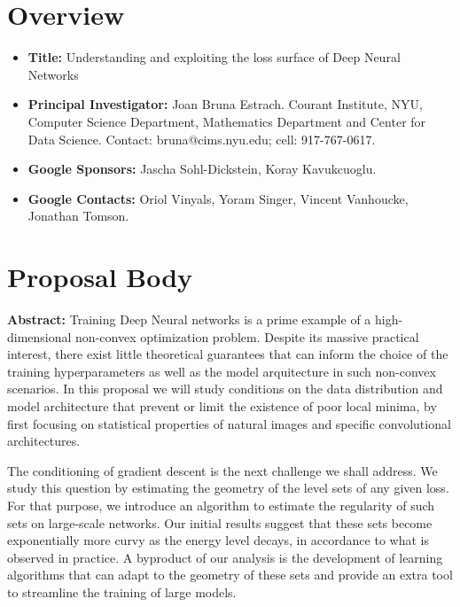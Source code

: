 \documentclass[10pt]{article}
\begin{document}


\section*{Overview}
\begin{itemize}
\item \textbf{Title:} Understanding and exploiting the loss surface of Deep Neural Networks  
\item \textbf{Principal Investigator: } Joan Bruna Estrach. Courant Institute, NYU, Computer Science Department, Mathematics Department and Center for Data Science. Contact: bruna@cims.nyu.edu; cell: 917-767-0617. 
\item \textbf{Google Sponsors:} Jascha Sohl-Dickstein, Koray Kavukcuoglu.
\item \textbf{Google Contacts:} Oriol Vinyals, Yoram Singer, Vincent Vanhoucke, Jonathan Tomson.
\end{itemize}

\section*{Proposal Body}

\textbf{Abstract:}
Training Deep Neural networks is a prime example of a high-dimensional non-convex 
optimization problem. Despite its massive practical interest, there exist little theoretical 
guarantees that can inform the choice of the training hyperparameters as well as the model 
arquitecture in such non-convex scenarios. In this proposal we will study conditions 
on the data distribution and model architecture that prevent or limit the existence 
of poor local minima, by first focusing on statistical properties of natural images
and specific convolutional architectures.
 
The conditioning of gradient descent is the next challenge we shall address. 
We study this question by estimating the geometry of the level sets of any given
loss. For that purpose, 
we introduce an algorithm to estimate the regularity of such sets on large-scale networks. 
Our initial results suggest that these sets become exponentially more curvy 
as the energy level decays, in accordance to what is observed in practice. 
A byproduct of our analysis is the development of learning algorithms that can adapt 
to the geometry of these sets and provide an extra tool to streamline the training of
large models.
\end{document}

